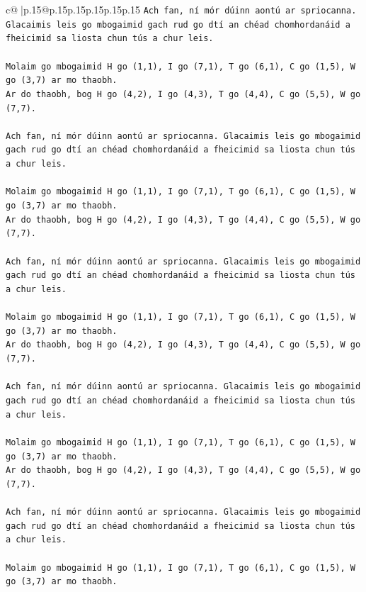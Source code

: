 \documentclass{article}
\begin{document}
{\begin{supertabular}{c@{$\;$}|p{.15\linewidth}@{}p{.15\linewidth}p{.15\linewidth}p{.15\linewidth}p{.15\linewidth}p{.15\linewidth}}
{{{\texttt{Ach fan, ní mór dúinn aontú ar spriocanna. Glacaimis leis go mbogaimid gach rud go dtí an chéad chomhordanáid a fheicimid sa liosta chun tús a chur leis.} \\
\\ 
\texttt{Molaim go mbogaimid H go (1,1), I go (7,1), T go (6,1), C go (1,5), W go (3,7) ar mo thaobh.} \\
\texttt{Ar do thaobh, bog H go (4,2), I go (4,3), T go (4,4), C go (5,5), W go (7,7).} \\
\\ 
\texttt{Ach fan, ní mór dúinn aontú ar spriocanna. Glacaimis leis go mbogaimid gach rud go dtí an chéad chomhordanáid a fheicimid sa liosta chun tús a chur leis.} \\
\\ 
\texttt{Molaim go mbogaimid H go (1,1), I go (7,1), T go (6,1), C go (1,5), W go (3,7) ar mo thaobh.} \\
\texttt{Ar do thaobh, bog H go (4,2), I go (4,3), T go (4,4), C go (5,5), W go (7,7).} \\
\\ 
\texttt{Ach fan, ní mór dúinn aontú ar spriocanna. Glacaimis leis go mbogaimid gach rud go dtí an chéad chomhordanáid a fheicimid sa liosta chun tús a chur leis.} \\
\\ 
\texttt{Molaim go mbogaimid H go (1,1), I go (7,1), T go (6,1), C go (1,5), W go (3,7) ar mo thaobh.} \\
\texttt{Ar do thaobh, bog H go (4,2), I go (4,3), T go (4,4), C go (5,5), W go (7,7).} \\
\\ 
\texttt{Ach fan, ní mór dúinn aontú ar spriocanna. Glacaimis leis go mbogaimid gach rud go dtí an chéad chomhordanáid a fheicimid sa liosta chun tús a chur leis.} \\
\\ 
\texttt{Molaim go mbogaimid H go (1,1), I go (7,1), T go (6,1), C go (1,5), W go (3,7) ar mo thaobh.} \\
\texttt{Ar do thaobh, bog H go (4,2), I go (4,3), T go (4,4), C go (5,5), W go (7,7).} \\
\\ 
\texttt{Ach fan, ní mór dúinn aontú ar spriocanna. Glacaimis leis go mbogaimid gach rud go dtí an chéad chomhordanáid a fheicimid sa liosta chun tús a chur leis.} \\
\\ 
\texttt{Molaim go mbogaimid H go (1,1), I go (7,1), T go (6,1), C go (1,5), W go (3,7) ar mo thaobh.} \\
}}}
\end{supertabular}}
\end{document}

